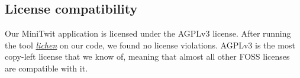\subsection{License compatibility}
Our MiniTwit application is licensed under the AGPLv3 license. After running the tool \textit{\href{https://github.com/uw-labs/lichen}{lichen}} on our code, we found no license violations. AGPLv3 is the most copy-left license that we know of, meaning that almost all other FOSS licenses are compatible with it.